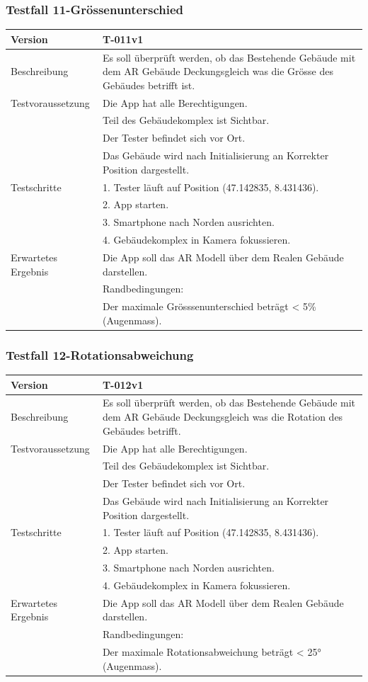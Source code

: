 \documentclass[a4paper]{scrreprt}
\begin{document}
\subsubsection{Testfall 11-Grössenunterschied}
\begin{tabularx}{\textwidth}{|l|X|}
\hline 
	Version &
	T-011v1 \\ 
\hline 
	Beschreibung & 
	Es soll überprüft werden, ob das Bestehende Gebäude mit dem AR Gebäude Deckungsgleich was die Grösse des Gebäudes betrifft ist. \\ 
\hline
    Testvoraussetzung &
	Die App hat alle Berechtigungen. \\ &
	Teil des Gebäudekomplex ist Sichtbar. \\ &
	Der Tester befindet sich vor Ort. \\ &
	Das Gebäude wird nach Initialisierung an Korrekter Position dargestellt. \\
\hline 
	Testschritte & 
		1. Tester läuft auf Position (47.142835, 8.431436). \\ &
		2. App starten. \\ &
		3. Smartphone nach Norden ausrichten. \\ &
		4. Gebäudekomplex in Kamera fokussieren. \\
\hline
	Erwartetes Ergebnis &
	Die App soll das AR Modell über dem Realen Gebäude darstellen. \\ &
	Randbedingungen: \\ &
		Der maximale Grösssenunterschied beträgt < 5\% (Augenmass). \\ 
\hline 
\end{tabularx}
\subsubsection{Testfall 12-Rotationsabweichung}
\begin{tabularx}{\textwidth}{|l|X|}
\hline 
	Version &
	T-012v1 \\ 
\hline 
	Beschreibung & 
	Es soll überprüft werden, ob das Bestehende Gebäude mit dem AR Gebäude Deckungsgleich was die Rotation des Gebäudes betrifft. \\ 
\hline 
	Testvoraussetzung &
	Die App hat alle Berechtigungen. \\ &
	Teil des Gebäudekomplex ist Sichtbar. \\ &
	Der Tester befindet sich vor Ort. \\ &
	Das Gebäude wird nach Initialisierung an Korrekter Position dargestellt. \\
\hline 
	Testschritte & 
		1. Tester läuft auf Position (47.142835, 8.431436). \\ &
		2. App starten. \\ &
		3. Smartphone nach Norden ausrichten. \\ &
		4. Gebäudekomplex in Kamera fokussieren. \\
\hline
	Erwartetes Ergebnis &
	Die App soll das AR Modell über dem Realen Gebäude darstellen. \\ &
	Randbedingungen: \\ &
		Der maximale Rotationsabweichung beträgt < \ang{25} (Augenmass). \\ 
\hline 
\end{tabularx}
\end{document}
